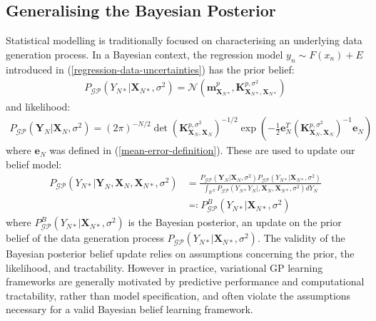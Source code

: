 \documentclass{article}
\newcommand{\GP}{\operatorname{\mathcal{GP}}}
\numberwithin{equation}{section}
\begin{document}
\subsection{Generalising the Bayesian Posterior}
Statistical modelling is traditionally focused on characterising an underlying data generation process. In a Bayesian context, the regression model $y_n \sim F(x_n) + E$ introduced in (\ref{regression-data-uncertainties}) has the prior belief:
\begin{align}
    P_{\GP}\left(Y_{N*}\vert \mathbf{X}_{N*}, \sigma^2\right) = \mathcal{N}\left(\mathbf{m}^p_{\mathbf{X}_{N*}}, \mathbf{K}^{p, \sigma^2}_{\mathbf{X}_{N*}, \mathbf{X}_{N*}}\right)
    \label{gp-prior-normal}
\end{align}
and likelihood:
\begin{align}
    P_{\GP}\left(\mathbf{Y}_N|\mathbf{X}_N, \sigma^2\right) = \left(2 \pi\right)^{-N/2} \det\left(\mathbf{K}^{p, \sigma^2}_{\mathbf{X}_{N}, \mathbf{X}_{N}}\right)^{-1/2} \exp\left(-\frac{1}{2}\mathbf{e}_N^T\left(\mathbf{K}^{p, \sigma^2}_{\mathbf{X}_{N}, \mathbf{X}_{N}}\right)^{-1}\mathbf{e}_N\right)
    \label{gp-likelihood-normal}
\end{align}
where $\mathbf{e}_N$ was defined in (\ref{mean-error-definition}). These are used to update our belief model: 
\begin{align}
\label{bayesian-posterior}
P_{\GP}\left(Y_{N*} \vert \mathbf{Y}_N, \mathbf{X}_N, \mathbf{X}_{N*}, \sigma^2 \right) &= \frac{P_{\GP}\left(\mathbf{Y}_N|\mathbf{X}_N, \sigma^2\right)P_{\GP}\left(Y_{N*}\vert \mathbf{X}_{N*}, \sigma^2\right)}{\int_{\mathbb{R}^{N}} P_{\GP}\left(Y_{N*} Y_N  \vert, \mathbf{X}_N, \mathbf{X}_{N*}, \sigma^2 \right) d Y_{N}} \\
\label{bayesian-posterior-definition}
&\eqqcolon P_{\GP}^B \left(Y_{N*} \vert\mathbf{X}_{N*}, \sigma^2 \right)
\end{align}
where $P_{\GP}^B \left(Y_{N*} \vert\mathbf{X}_{N*}, \sigma^2 \right)$ is the Bayesian posterior, an update on the prior belief of the data generation process $P_{\GP}\left(Y_{N*}\vert \mathbf{X}_{N*}, \sigma^2\right)$. The validity of the Bayesian posterior belief update relies on assumptions concerning the prior, the likelihood, and tractability. However in practice, variational GP learning frameworks are generally motivated by predictive performance and computational tractability, rather than model specification, and often violate the assumptions necessary for a valid Bayesian belief learning framework.
\end{document}
